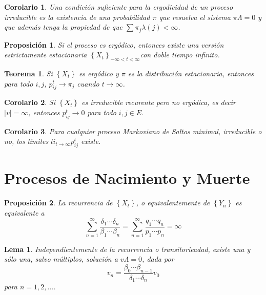 \documentclass{article}
\newtheorem{Teo}{Teorema}
\newtheorem{Prop}{Proposición}
\newtheorem{Cor}{Corolario}
\newtheorem{Lema}{Lema}
\begin{document}
\begin{Cor}\label{Cor.4.4}
Una condici\'on suficiente para la ergodicidad de un proceso irreducible es la existencia de una probabilidad $\pi$ que resuelva el sistema $\pi\Lambda=0$ y que adem\'as tenga la propiedad de que $\sum\pi_{j}\lambda\left(j\right)<\infty$.
\end{Cor}

\begin{Prop}
Si el proceso es erg\'odico, entonces existe una versi\'on estrictamente estacionaria
$\left\{X_{t}\right\}_{-\infty<t<\infty}$con doble tiempo
infinito.
\end{Prop}

\begin{Teo}
Si $\left\{X_{t}\right\}$ es erg\'odico y $\pi$ es la distribuci\'on estacionaria, entonces para todo $i,j$, $p_{ij}^{t}\rightarrow\pi_{j}$ cuando $t\rightarrow\infty$.
\end{Teo}

\begin{Cor}
Si $\left\{X_{t}\right\}$ es irreducible recurente pero no erg\'odica, es decir $|v|=\infty$, entonces $p_{ij}^{t}\rightarrow0$ para todo $i,j\in E$.
\end{Cor}

\begin{Cor}
Para cualquier proceso Markoviano de Saltos minimal, irreducible o
no, los l\'imites $li_{t\rightarrow\infty}p_{ij}^{t}$ existe.
\end{Cor}


%
\section{Procesos de Nacimiento y Muerte}
%

\begin{Prop}\label{Prop.2.1}
La recurrencia de $\left\{X_{t}\right\}$, o equivalentemente de
$\left\{Y_{n}\right\}$ es equivalente a
\begin{equation}\label{Eq.2.1}
\sum_{n=1}^{\infty}\frac{\delta_{1}\cdots\delta_{n}}{\beta_{1}\cdots\beta_{n}}=\sum_{n=1}^{\infty}\frac{q_{1}\cdots
q_{n}}{p_{1}\cdots p_{n}}=\infty
\end{equation}
\end{Prop}

\begin{Lema}\label{Lema.2.2}
Independientemente de la recurrencia o transitorieadad, existe una
y s\'olo una, salvo m\'ultiplos, soluci\'on a $v\Lambda=0$, dada por
\begin{equation}\label{Eq.2.2}
v_{n}=\frac{\beta_{0}\cdots\beta_{n-1}}{\delta_{1}\cdots\delta_{n}}v_{0}
\end{equation}
para $n=1,2,\ldots$.
\end{Lema}
\end{document}

